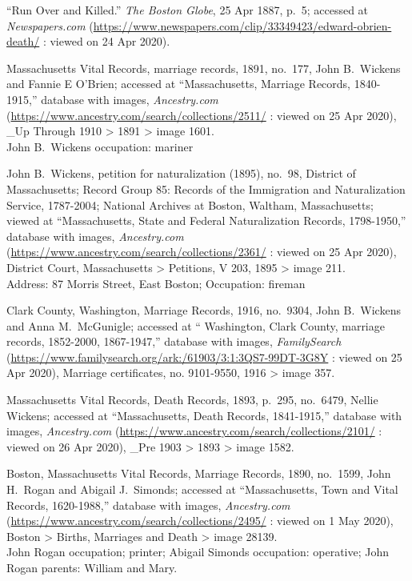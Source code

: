 \begin{thebibliography}{999}
``Run Over and Killed.'' \textit{The Boston Globe}, 25 Apr 1887, p.\ 5; accessed at \textit{Newspapers.com} (\url{https://www.newspapers.com/clip/33349423/edward-obrien-death/} : viewed on 24 Apr 2020).

Massachusetts Vital Records, marriage records, 1891, no.\ 177, John B.\ Wickens and Fannie E O'Brien; accessed at ``Massachusetts, Marriage Records, 1840-1915,'' database with images, \textit{Ancestry.com} (\url{https://www.ancestry.com/search/collections/2511/} : viewed on 25 Apr 2020), \_Up Through 1910 > 1891 > image 1601.\\
John B.\ Wickens occupation: mariner

John B.\ Wickens, petition for naturalization (1895), no.\ 98, District of Massachusetts; Record Group 85: Records of the Immigration and Naturalization Service, 1787-2004; National Archives at Boston, Waltham, Massachusetts; viewed at ``Massachusetts, State and Federal Naturalization Records, 1798-1950,'' database with images, \textit{Ancestry.com} (\url{https://www.ancestry.com/search/collections/2361/} : viewed on 25 Apr 2020), District Court, Massachusetts > Petitions, V 203, 1895 > image 211.\\
Address: 87 Morris Street, East Boston; Occupation: fireman

Clark County, Washington, Marriage Records, 1916, no.\ 9304, John B.\ Wickens and Anna M.\ McGunigle; accessed at `` Washington, Clark County, marriage records, 1852-2000, 1867-1947,'' database with images, \textit{FamilySearch} (\url{https://www.familysearch.org/ark:/61903/3:1:3QS7-99DT-3G8Y} : viewed on 25 Apr 2020), Marriage certificates, no. 9101-9550, 1916 > image 357.

Massachusetts Vital Records, Death Records, 1893, p.\ 295, no.\ 6479, Nellie Wickens; accessed at ``Massachusetts, Death Records, 1841-1915,'' database with images, \textit{Ancestry.com} (\url{https://www.ancestry.com/search/collections/2101/} : viewed on 26 Apr 2020), \_Pre 1903 > 1893 > image 1582.

Boston, Massachusetts Vital Records, Marriage Records, 1890, no.\ 1599, John H.\ Rogan and Abigail J.\ Simonds; accessed at ``Massachusetts, Town and Vital Records, 1620-1988,'' database with images, \textit{Ancestry.com} (\url{https://www.ancestry.com/search/collections/2495/} : viewed on 1 May 2020), Boston > Births, Marriages and Death > image 28139.\\
John Rogan occupation; printer; Abigail Simonds occupation: operative; John Rogan parents: William and Mary.


\end{thebibliography}
